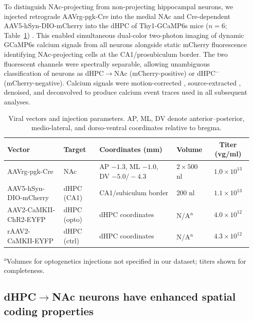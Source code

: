 \documentclass[11pt]{article}
\begin{document}
To distinguish NAc-projecting from non-projecting hippocampal neurons, we injected retrograde AAVrg-pgk-Cre into the medial NAc and Cre-dependent AAV5-hSyn-DIO-mCherry into the dHPC of Thy1-GCaMP6s mice ($n=6$; Table~\ref{tab:viral}) \citep{tervo2016designer}. This enabled simultaneous dual-color two-photon imaging of dynamic GCaMP6s calcium signals from all neurons alongside static mCherry fluorescence identifying NAc-projecting cells at the CA1/prosubiculum border. The two fluorescent channels were spectrally separable, allowing unambiguous classification of neurons as dHPC$\to$NAc (mCherry-positive) or dHPC$^-$ (mCherry-negative). Calcium signals were motion-corrected \citep{pnevmatikakis2017normcorre}, source-extracted \citep{pachitariu2017suite2p}, denoised, and deconvolved to produce calcium event traces used in all subsequent analyses.

\begin{table}[H]
\centering
\caption{Viral vectors and injection parameters. AP, ML, DV denote anterior--posterior, medio-lateral, and dorso-ventral coordinates relative to bregma.}
\label{tab:viral}
\begin{tabular}{llllc}
\toprule
Vector & Target & Coordinates (mm) & Volume & Titer (vg/ml) \\
\midrule
AAVrg-pgk-Cre & NAc & AP $-1.3$, ML $-1.0$, DV $-5.0/-4.3$ & $2 \times 500$ nl & $1.0 \times 10^{13}$ \\
AAV5-hSyn-DIO-mCherry & dHPC (CA1) & CA1/subiculum border & 200 nl & $1.1 \times 10^{13}$ \\
AAV2-CaMKII-ChR2-EYFP & dHPC (opto) & dHPC coordinates & N/A\textsuperscript{a} & $4.0 \times 10^{12}$ \\
rAAV2-CaMKII-EYFP & dHPC (ctrl) & dHPC coordinates & N/A\textsuperscript{a} & $4.3 \times 10^{12}$ \\
\bottomrule
\end{tabular}
\vspace{2pt}

\footnotesize{\textsuperscript{a}Volumes for optogenetics injections not specified in our dataset; titers shown for completeness.}
\end{table}

\subsection{dHPC$\to$NAc neurons have enhanced spatial coding properties}
\end{document}
